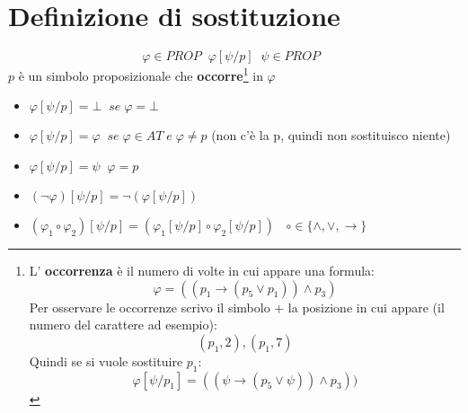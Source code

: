 \documentclass{article}
\theoremstyle{break}
\theoremstyle{break}
\theoremstyle{break}
\theoremstyle{break}
\begin{document}
\section{Definizione di sostituzione}
\begin{definition}
  \[
    \varphi \in PROP\;\; \varphi[\psi/p]\;\; \psi \in PROP\;\;
  \]  
  \( p \) è un simbolo proposizionale che \textbf{occorre}\footnote{L' \textbf{occorrenza} è il numero di volte
    in cui appare una formula:
    \[
      \varphi=((p_1 \to (p_5 \vee p_1))\wedge p_3)
    \] 
    Per osservare le occorrenze scrivo il simbolo + la posizione in cui appare (il numero del carattere ad esempio):
    \[
      (p_1, 2), (p_1, 7)
    \]
    Quindi se si vuole sostituire \( p_1 \): \[ \varphi[\psi/p_1] = ((\psi \to (p_5 \vee \psi))\wedge p_3)) \]
  } in \( \varphi \)
  \begin{itemize}
    \item \( \varphi[\psi/p] = \bot\;\; se\; \varphi = \bot \)
    \item \( \varphi[\psi/p] = \varphi\;\; se\;\varphi \in AT\; e\; \varphi \neq p \) (non c'è la p, quindi non sostituisco niente)
    \item \( \varphi[\psi/p] = \psi\;\; \varphi = p \) 
    \item \( (\neg \varphi)[\psi/p] =  \neg (\varphi[\psi/p])\) 
    \item \( (\varphi_1 \circ \varphi_2)[\psi/p]=(\varphi_1[\psi/p] \circ \varphi_2[\psi/p]) \)  \(\;\; \circ \in  \{ \wedge, \vee, \to  \} \) 
  \end{itemize}
\end{definition}
\end{document}
